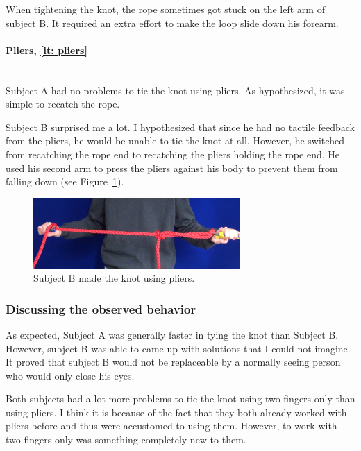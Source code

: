                 When tightening the knot, the rope sometimes got stuck on the left arm of subject B. It required an extra effort to make the loop slide down his forearm.

            \paragraph{Pliers, \ref{it: pliers}}~\\
                \indent Subject A had no problems to tie the knot using pliers. As hypothesized, it was simple to recatch the rope.

                Subject B surprised me a lot. I hypothesized that since he had no tactile feedback from the pliers, he would be unable to tie the knot at all. However, he switched from recatching the rope end to recatching the pliers holding the rope end. He used his second arm to press the pliers against his body to prevent them from falling down (see Figure~\ref{fig:BPliers}).

                \begin{figure}[h]
                \includegraphics[width=0.7\textwidth]{BPliers.png}
                \centering
                \caption{Subject B made the knot using pliers.}
                \label{fig:BPliers}
                \end{figure}


        \subsubsection{Discussing the observed behavior}
            As expected, Subject A was generally faster in tying the knot than Subject B. However, subject B was able to came up with solutions that I could not imagine. It proved that subject B would not be replaceable by a normally seeing person who would only close his eyes.

            Both subjects had a lot more problems to tie the knot using two fingers only than using pliers. I think it is because of the fact that they both already worked with pliers before and thus were accustomed to using them. However, to work with two fingers only was something completely new to them.

